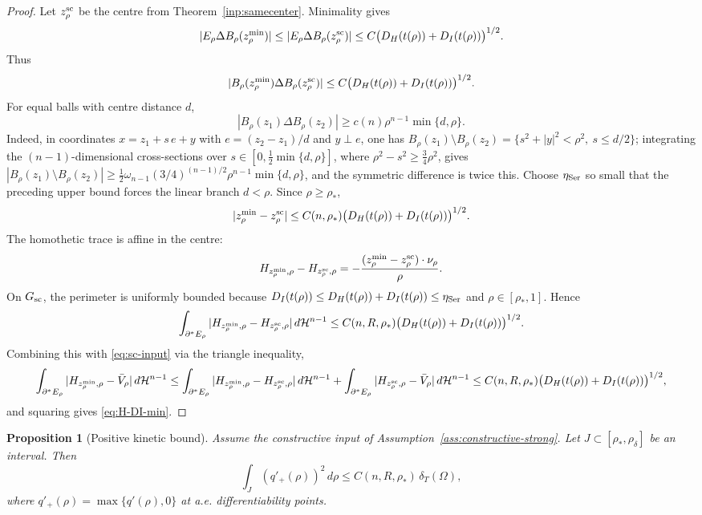 \documentclass[11pt]{amsart}
\newtheorem{proposition}[theorem]{Proposition}
\theoremstyle{definition}
\newcommand{\Om}{\Omega}
\newcommand{\dT}{\delta_T}
\newcommand{\rstar}{\rho_*}
\newcommand{\rdel}{\rho_\delta}
\newcommand{\Hn}{\mathcal H^{n-1}}
\begin{document}
\begin{proof}
Let \(z_\rho^{\rm sc}\) be the centre from
Theorem~\ref{inp:samecenter}.  Minimality gives
\[
   |E_\rho\Delta B_\rho(z_\rho^{\min})|
   \le |E_\rho\Delta B_\rho(z_\rho^{\rm sc})|
   \le C \bigl(D_H(t(\rho))+D_I(t(\rho))\bigr)^{1/2}.
\]
Thus
\[
   |B_\rho(z_\rho^{\min})\Delta B_\rho(z_\rho^{\rm sc})|
   \le C \bigl(D_H(t(\rho))+D_I(t(\rho))\bigr)^{1/2}.
\]
For equal balls with centre distance \(d\),
\[
   |B_\rho(z_1)\Delta B_\rho(z_2)|
   \ge c(n)\rho^{n-1}\min\{d,\rho\}.
\]
Indeed, in coordinates \(x=z_1+s\,e+y\) with \(e=(z_2-z_1)/d\) and
\(y\perp e\), one has \(B_\rho(z_1)\setminus B_\rho(z_2)
=\{s^2+|y|^2<\rho^2,\ s\le d/2\}\); integrating the \((n-1)\)-dimensional
cross-sections over \(s\in[0,\tfrac12\min\{d,\rho\}]\), where
\(\rho^2-s^2\ge\tfrac34\rho^2\), gives
\(|B_\rho(z_1)\setminus B_\rho(z_2)|\ge
\tfrac12\omega_{n-1}(3/4)^{(n-1)/2}\rho^{n-1}\min\{d,\rho\}\), and the
symmetric difference is twice this.
Choose \(\eta_{\rm Ser}\) so small that the preceding upper bound forces the
linear branch \(d<\rho\).  Since \(\rho\ge\rstar\),
\[
   |z_\rho^{\min}-z_\rho^{\rm sc}|
   \le C(n,\rstar)\bigl(D_H(t(\rho))+D_I(t(\rho))\bigr)^{1/2}.
\]
The homothetic trace is affine in the centre:
\[
   H_{z_\rho^{\min},\rho}-H_{z_\rho^{\rm sc},\rho}
   =
   -\frac{(z_\rho^{\min}-z_\rho^{\rm sc})\cdot\nu_\rho}{\rho}.
\]
On \(G_{\rm sc}\), the perimeter is uniformly bounded because
\(D_I(t(\rho))\le D_H(t(\rho))+D_I(t(\rho))\le\eta_{\rm Ser}\) and
\(\rho\in[\rstar,1]\).  Hence
\[
   \int_{\partial^*E_\rho}
   |H_{z_\rho^{\min},\rho}-H_{z_\rho^{\rm sc},\rho}|\,d\Hn
   \le C(n,R,\rstar)\bigl(D_H(t(\rho))+D_I(t(\rho))\bigr)^{1/2}.
\]
Combining this with \eqref{eq:sc-input} via the triangle inequality,
\[
   \int_{\partial^*E_\rho}
      |H_{z_\rho^{\min},\rho}-\bar V_\rho|\,d\Hn
   \le
   \int_{\partial^*E_\rho}
      |H_{z_\rho^{\min},\rho}-H_{z_\rho^{\rm sc},\rho}|\,d\Hn
   +\int_{\partial^*E_\rho}
      |H_{z_\rho^{\rm sc},\rho}-\bar V_\rho|\,d\Hn
   \le C(n,R,\rstar)\bigl(D_H(t(\rho))+D_I(t(\rho))\bigr)^{1/2},
\]
and squaring gives \eqref{eq:H-DI-min}.
\end{proof}

\begin{proposition}[Positive kinetic bound]
\label{prop:positivekinetic}
Assume the constructive input of Assumption~\ref{ass:constructive-strong}.  Let
\(J\subset[\rstar,\rdel]\) be an interval.  Then
\[
   \int_J (q'_+(\rho))^2\,d\rho
   \le C(n,R,\rstar)\,\dT(\Om),
\]
where \(q'_+(\rho)=\max\{q'(\rho),0\}\) at a.e. differentiability points.
\end{proposition}
\end{document}
